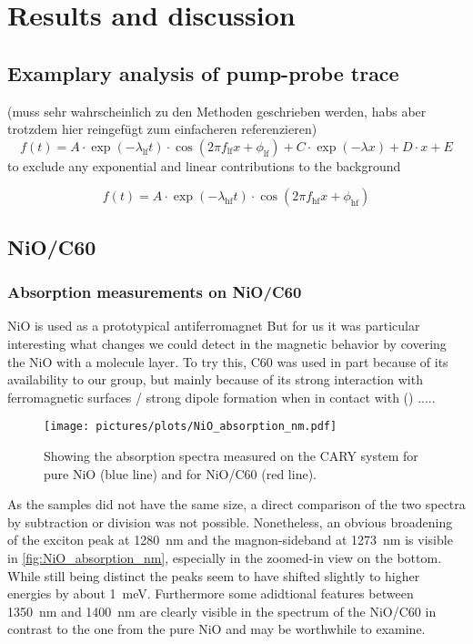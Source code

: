 \chapter{Results and discussion}
\section{Examplary analysis of pump-probe trace}
(muss sehr wahrscheinlich zu den Methoden geschrieben werden, habs aber trotzdem hier reingefügt zum einfacheren referenzieren)
\begin{equation}
    f(t) = A \cdot \exp(-\lambda_{\text{lf}} t) \cdot \cos(2 \pi f_{\text{lf}} x + \phi_{\text{lf}}) + C \cdot \exp(-\lambda x) + D \cdot x + E
    \label{eqn:fit_lf}
\end{equation}
to exclude any exponential and linear contributions to the background

\begin{equation}
    f(t) = A \cdot \exp(-\lambda_{\text{hf}} t) \cdot \cos(2 \pi f_{\text{hf}} x + \phi_{\text{hf}})
    \label{eqn:fit_hf}
\end{equation}


\section{NiO/C60}
\subsection{Absorption measurements on NiO/C60}
NiO is used as a prototypical antiferromagnet 
But for us it was particular interesting what changes we could detect in the magnetic behavior by covering the NiO with a molecule layer.
To try this, C60 was used in part because of its availability to our group, but mainly because of its strong interaction with ferromagnetic surfaces / strong dipole formation when in contact with () .....
\begin{figure}[ht]
    \centering
    \texttt{[image: pictures/plots/NiO\_absorption\_nm.pdf]}
    \caption{Showing the absorption spectra measured on the CARY system for pure NiO (blue line) and for NiO/C60 (red line).}
    \label{fig:NiO_absorption_nm}
\end{figure}
\FloatBarrier
As the samples did not have the same size, a direct comparison of the two spectra by subtraction or division was not possible.
Nonetheless, an obvious broadening of the exciton peak at \qty{1280}{nm} and the magnon-sideband at \qty{1273}{nm} is visible in \autoref{fig:NiO_absorption_nm}, especially in the zoomed-in view on the bottom.
While still being distinct the peaks seem to have shifted slightly to higher energies by about \qty{1}{meV}.
Furthermore some adidtional features between \qty{1350}{nm} and \qty{1400}{nm} are clearly visible in the spectrum of the NiO/C60 in contrast to the one from the pure NiO and may be worthwhile to examine.

